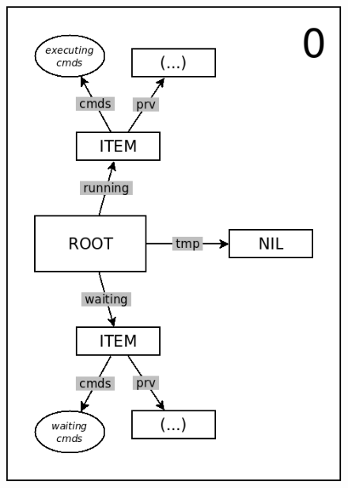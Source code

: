 \documentclass{acm_proc_article-sp}
\begin{document}
\begin{figure}%
\begin{minipage}[t]{0.24\linewidth}
\centering
\includegraphics[scale=0.25]{queue-10.png}
\end{minipage}
\begin{minipage}[t]{0.24\linewidth}
\centering

\end{minipage}
\end{figure}
\end{document}
